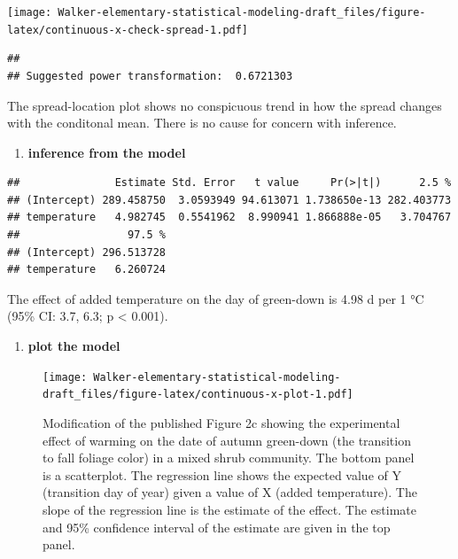 \documentclass[]{book}
\newenvironment{Shaded}{\begin{snugshade}}{\end{snugshade}}
\newcommand{\KeywordTok}[1]{\textcolor[rgb]{0.13,0.29,0.53}{\textbf{#1}}}
\newcommand{\NormalTok}[1]{#1}
\newcommand{\OperatorTok}[1]{\textcolor[rgb]{0.81,0.36,0.00}{\textbf{#1}}}
\newcommand{\StringTok}[1]{\textcolor[rgb]{0.31,0.60,0.02}{#1}}
\providecommand{\tightlist}{%
  \setlength{\itemsep}{0pt}\setlength{\parskip}{0pt}}
\begin{document}
\texttt{[image: Walker-elementary-statistical-modeling-draft\_files/figure-latex/continuous-x-check-spread-1.pdf]}

\begin{verbatim}
## 
## Suggested power transformation:  0.6721303
\end{verbatim}

The spread-location plot shows no conspicuous trend in how the spread changes with the conditonal mean. There is no cause for concern with inference.

\begin{enumerate}
\def\labelenumi{\arabic{enumi}.}
\setcounter{enumi}{4}
\tightlist
\item
  \textbf{inference from the model}
\end{enumerate}

\begin{Shaded}
\end{Shaded}

\begin{verbatim}
##               Estimate Std. Error   t value     Pr(>|t|)      2.5 %
## (Intercept) 289.458750  3.0593949 94.613071 1.738650e-13 282.403773
## temperature   4.982745  0.5541962  8.990941 1.866888e-05   3.704767
##                 97.5 %
## (Intercept) 296.513728
## temperature   6.260724
\end{verbatim}

The effect of added temperature on the day of green-down is 4.98 d per 1 °C (95\% CI: 3.7, 6.3; p \textless{} 0.001).

\begin{enumerate}
\def\labelenumi{\arabic{enumi}.}
\setcounter{enumi}{5}
\tightlist
\item
  \textbf{plot the model}
\end{enumerate}

\begin{figure}
\centering
\texttt{[image: Walker-elementary-statistical-modeling-draft\_files/figure-latex/continuous-x-plot-1.pdf]}
\caption{\label{fig:continuous-x-plot}Modification of the published Figure 2c showing the experimental effect of warming on the date of autumn green-down (the transition to fall foliage color) in a mixed shrub community. The bottom panel is a scatterplot. The regression line shows the expected value of Y (transition day of year) given a value of X (added temperature). The slope of the regression line is the estimate of the effect. The estimate and 95\% confidence interval of the estimate are given in the top panel.}
\end{figure}
\end{document}
